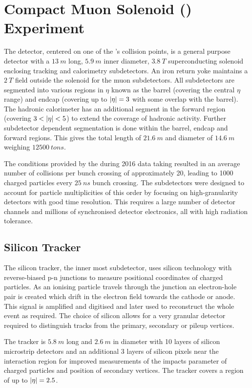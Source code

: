 \section{Compact Muon Solenoid (\CMS) Experiment}

The \CMS detector, centered on one of the \LHC's collision points, is a general
purpose detector with a ${\SI{13}{m}}$ long, ${\SI{5.9}{m}}$ inner diameter,
${\SI{3.8}{T}}$ superconducting solenoid enclosing tracking and calorimetry
subdetectors. An iron return yoke maintains a ${\SI{2}{T}}$ field outside the
solenoid for the muon subdetectors. All subdetectors are segmented into various
regions in $\eta$ known as the barrel (covering the central $\eta$ range) and
endcap (covering up to $|\eta|=3$ with some overlap with the barrel). The
hadronic calorimeter has an additional segment in the forward region (covering
$3<\aeta<5$) to extend the coverage of hadronic activity. Further subdetector
dependent segmentation is done within the barrel, endcap and forward regions.
This gives \CMS the total length of ${\SI{21.6}{m}}$ and diameter of
${\SI{14.6}{m}}$ weighing ${\SI{12500}{tons}}$.

The conditions provided by the \LHC during 2016 data taking resulted in an
average number of collisions per bunch crossing of approximately 20, leading
to 1000 charged particles every ${\SI{25}{ns}}$ bunch crossing. The
subdetectors were designed to account for particle multiplicities of this order
by focusing on high-granularity detectors with good time resolution. This
requires a large number of detector channels and millions of synchronised
detector electronics, all with high radiation tolerance.

\subsection{Silicon Tracker}

The silicon tracker, the inner most subdetector, uses silicon technology with
reverse-biased p-n junctions to measure positional coordinates of charged
particles. As an ionising particle travels through the junction an electron-hole
pair is created which drift in the electron field towards the cathode or anode.
This signal is amplified and digitised and later used to reconstruct the whole
event as required. The choice of silicon allows for a very granular detector
required to distinguish tracks from the primary, secondary or pileup vertices.

The tracker is ${\SI{5.8}{m}}$ long and ${\SI{2.6}{m}}$ in diameter with 10
layers of silicon microstrip detectors and an additional 3 layers of silicon
pixels near the interaction region for improved measurements of the impacts
parameter of charged particles and position of secondary vertices. The tracker
covers a region of up to ${|\eta|=2.5}$.



